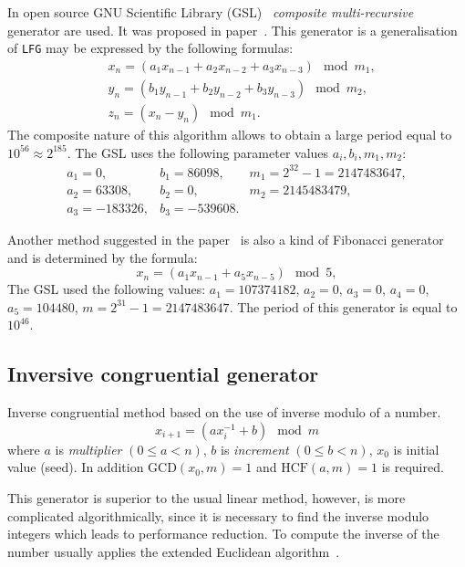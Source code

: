 \documentclass[%
floatfix,
showkeys,
nofootinbib, %
superscriptaddress, %
]{revtex4-1}
\begin{document}
In open source GNU Scientific Library (GSL)~\cite{L_GSL:2015}
\emph{composite multi-recursive} generator are used. It was proposed
in paper~\cite{L_Ecuyer:1996}. This generator is a generalisation of
\texttt{LFG} may be expressed by the following formulas:
\[
        \begin{aligned}
                & x_{n} = (a_1 x_{n-1} + a_2 x_{n-2} + a_3 x_{n-3}) \mod m_{1},\\
                & y_{n} = (b_1 y_{n-1} + b_2 y_{n-2} + b_3 y_{n-3}) \mod m_{2},\\
                & z_{n} = (x_{n} - y_{n}) \mod m_{1}.
        \end{aligned}
\]
The composite nature of this algorithm allows to obtain a large period
equal to $10^{56} \approx 2^{185}$. The GSL uses the following
parameter values $a_{i}, b_{i}, m_{1}, m_{2}$:
\[
        \begin{array}{lll}
                a_1 = 0, & b_1 = 86098, & m_1 = 2^{32} - 1 = 2147483647,\\
                a_2 = 63308, & b_2 = 0, & m_2 = 2145483479,\\
                a_3 = -183326, & b_3 = -539608. &
        \end{array}
\]

Another method suggested in the paper~\cite{L_Ecuyer:1993:1} is also a
kind of Fibonacci generator and is determined by the formula:
\[
        x_{n} = (a_1 x_{n-1} + a_5 x_{n-5}) \mod 5,
\]
The GSL used the following values: $a_1 = 107374182$, $a_2 = 0$, $a_3 = 0$, $a_4 = 0$, $a_5 = 104480$, $m = 2^{31} - 1 = 2147483647$. The period of this generator is equal to $10^{46}$.
\subsection{Inversive congruential generator}
Inverse congruential method based on the use of inverse modulo of a number.
\[
        x_{i+1} = (a x^{-1}_{i} + b) \mod m
\]
where $a$ is \emph{multiplier} $(0\leqslant a < n)$, $b$ is
\emph{increment} $(0\leqslant b < n)$, $x_0$ is initial value
(seed). In addition $\text{GCD}(x_0,m)=1$ and $\text{HCF}(a,m)=1$ is
required.

This generator is superior to the usual linear method, however, is
more complicated algorithmically, since it is necessary to find the
inverse modulo integers which leads to performance reduction. To
compute the inverse of the number usually applies the extended
Euclidean algorithm~\cite[\S 4.3.2]{L_DKnuth:1997:en}.
\end{document}
